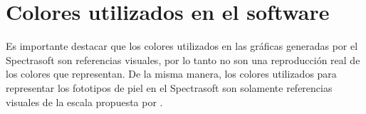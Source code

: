 \section{Colores utilizados en el software}

	Es importante destacar que los colores utilizados en las gr\'{a}ficas generadas por el Spectrasoft son referencias visuales, por lo tanto no son una reproducci\'{o}n real de los colores que representan. De la misma manera, los colores utilizados para representar los fototipos de piel en el Spectrasoft son solamente referencias visuales de la escala propuesta por .